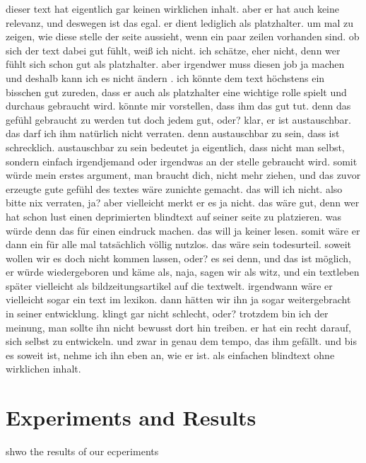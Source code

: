 \documentclass[conference]{IEEEtran}
\begin{document}
dieser text hat eigentlich gar keinen wirklichen inhalt. aber er hat auch keine relevanz, und deswegen ist das egal. er dient lediglich als platzhalter. um mal zu zeigen, wie diese stelle der seite aussieht, wenn ein paar zeilen vorhanden sind. ob sich der text dabei gut fühlt, weiß ich nicht. ich schätze, eher nicht, denn wer fühlt sich schon gut als platzhalter. aber irgendwer muss diesen job ja machen und deshalb kann ich es nicht ändern . ich könnte dem text höchstens ein bisschen gut zureden, dass er auch als platzhalter eine wichtige rolle spielt und durchaus gebraucht wird. könnte mir vorstellen, dass ihm das gut tut. denn das gefühl gebraucht zu werden tut doch jedem gut, oder? klar, er ist austauschbar. das darf ich ihm natürlich nicht verraten. denn austauschbar zu sein, dass ist schrecklich. austauschbar zu sein bedeutet ja eigentlich, dass nicht man selbst, sondern einfach irgendjemand oder irgendwas an der stelle gebraucht wird. somit würde mein erstes argument, man braucht dich, nicht mehr ziehen, und das zuvor erzeugte gute gefühl des textes wäre zunichte gemacht. das will ich nicht. also bitte nix verraten, ja? aber vielleicht merkt er es ja nicht. das wäre gut, denn wer hat schon lust einen deprimierten blindtext auf seiner seite zu platzieren. was würde denn das für einen eindruck machen. das will ja keiner lesen. somit wäre er dann ein für alle mal tatsächlich völlig nutzlos. das wäre sein todesurteil. soweit wollen wir es doch nicht kommen lassen, oder? es sei denn, und das ist möglich, er würde wiedergeboren und käme als, naja, sagen wir als witz, und ein textleben später vielleicht als bildzeitungsartikel auf die textwelt. irgendwann wäre er vielleicht sogar ein text im lexikon. dann hätten wir ihn ja sogar weitergebracht in seiner entwicklung. klingt gar nicht schlecht, oder? trotzdem bin ich der meinung, man sollte ihn nicht bewusst dort hin treiben. er hat ein recht darauf, sich selbst zu entwickeln. und zwar in genau dem tempo, das ihm gefällt. und bis es soweit ist, nehme ich ihn eben an, wie er ist. als einfachen blindtext ohne wirklichen inhalt.


\section{Experiments and Results}
shwo the results of our ecperiments
\end{document}
